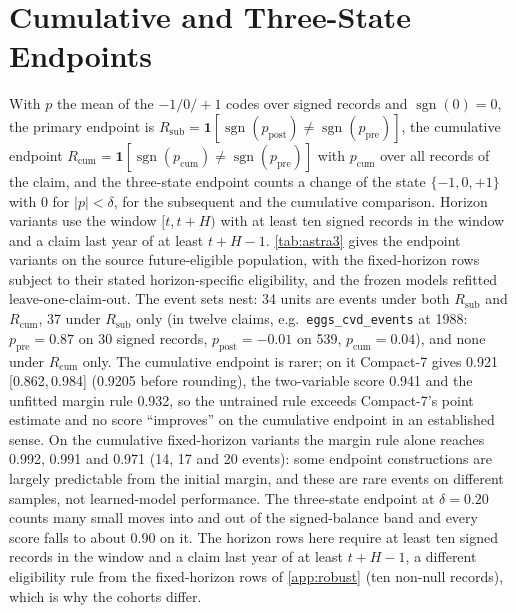 \documentclass[11pt]{article}
\newcommand{\compact}{Compact-7\xspace}
\newcommand{\ci}[2]{[#1,\,#2]}
\newcommand{\sgn}{\operatorname{sgn}}
\begin{document}
\section{Cumulative and Three-State Endpoints}
\label{app:cumulative}
With $p$ the mean of the $-1/0/+1$ codes over signed records and $\sgn(0)=0$, the primary endpoint
is $R_{\mathrm{sub}}=\mathbf{1}[\sgn(p_{\mathrm{post}})\neq\sgn(p_{\mathrm{pre}})]$, the cumulative
endpoint $R_{\mathrm{cum}}=\mathbf{1}[\sgn(p_{\mathrm{cum}})\neq\sgn(p_{\mathrm{pre}})]$ with
$p_{\mathrm{cum}}$ over all records of the claim, and the three-state endpoint counts a change of
the state $\{-1,0,+1\}$ with $0$ for $|p|<\delta$, for the subsequent and the cumulative
comparison. Horizon variants use the window $[t,t+H)$ with at least ten signed records in the
window and a claim last year of at least $t+H-1$. \cref{tab:astra3} gives the endpoint variants on the source future-eligible population, with
the fixed-horizon rows subject to their stated horizon-specific eligibility, and the frozen models
refitted leave-one-claim-out. The event sets
nest: 34 units are events under both $R_{\mathrm{sub}}$ and $R_{\mathrm{cum}}$, 37 under
$R_{\mathrm{sub}}$ only (in twelve claims, e.g.\ \texttt{eggs\_cvd\_events} at 1988: $p_{\mathrm{pre}}=0.87$ on 30
signed records, $p_{\mathrm{post}}=-0.01$ on 539, $p_{\mathrm{cum}}=0.04$), and none under
$R_{\mathrm{cum}}$ only. The cumulative endpoint is rarer; on it \compact gives 0.921 \ci{0.862}{0.984} (0.9205 before
rounding), the two-variable score 0.941 and the unfitted margin rule 0.932, so the untrained rule
exceeds \compact's point estimate and no score ``improves'' on the cumulative endpoint in an
established sense. On the cumulative fixed-horizon variants the margin rule alone reaches 0.992,
0.991 and 0.971 (14, 17 and 20 events): some endpoint constructions are largely predictable from
the initial margin, and these are rare events on different samples, not learned-model
performance. The three-state endpoint at $\delta=0.20$ counts many small moves into and out of
the signed-balance band and every score falls to about 0.90 on it. The horizon rows here require
at least ten signed records in the window and a claim last year of at least $t+H-1$, a different
eligibility rule from the fixed-horizon rows of \cref{app:robust} (ten non-null records),
which is why the cohorts differ.
\end{document}
